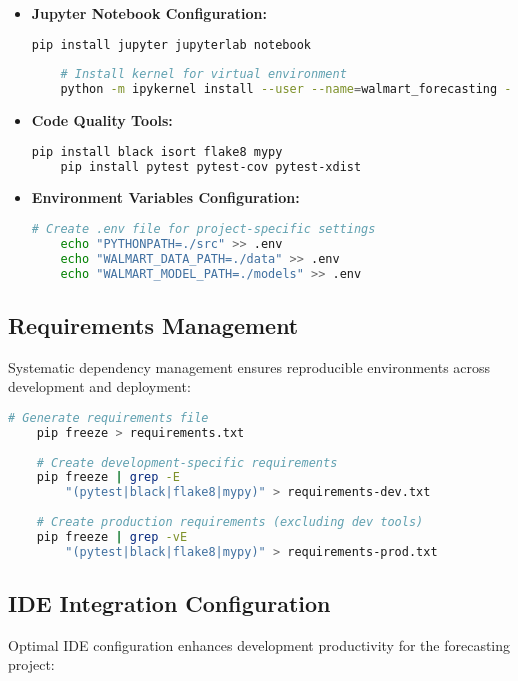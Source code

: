 \begin{itemize}
	\item \textbf{Jupyter Notebook Configuration:}
	\begin{lstlisting}[language=bash]
	pip install jupyter jupyterlab notebook
		
	# Install kernel for virtual environment
	python -m ipykernel install --user --name=walmart_forecasting --display-name="Walmart Forecasting (Python 3.12)"
	\end{lstlisting}
	
	\item \textbf{Code Quality Tools:}
	\begin{lstlisting}[language=bash]
	pip install black isort flake8 mypy
	pip install pytest pytest-cov pytest-xdist
	\end{lstlisting}
	
	\item \textbf{Environment Variables Configuration:}
	\begin{lstlisting}[language=bash]
	# Create .env file for project-specific settings
	echo "PYTHONPATH=./src" >> .env
	echo "WALMART_DATA_PATH=./data" >> .env  
	echo "WALMART_MODEL_PATH=./models" >> .env
	\end{lstlisting}
\end{itemize}

\subsection{Requirements Management}

Systematic dependency management ensures reproducible environments across development and deployment:

\begin{lstlisting}[language=bash]
	# Generate requirements file
	pip freeze > requirements.txt
	
	# Create development-specific requirements
	pip freeze | grep -E 
		"(pytest|black|flake8|mypy)" > requirements-dev.txt
	
	# Create production requirements (excluding dev tools)
	pip freeze | grep -vE 
		"(pytest|black|flake8|mypy)" > requirements-prod.txt
\end{lstlisting}

\subsection{IDE Integration Configuration}

Optimal IDE configuration enhances development productivity for the forecasting project:

